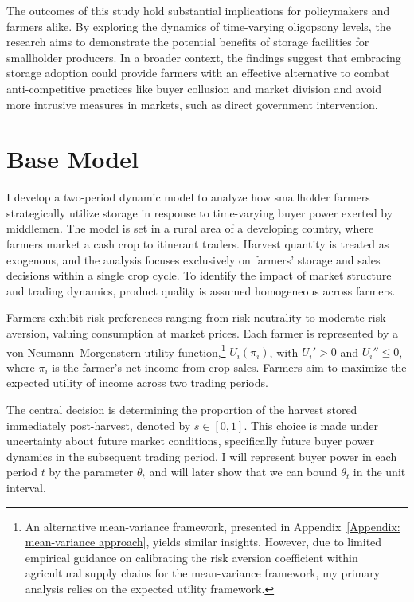 The outcomes of this study hold substantial implications for policymakers and farmers alike. By exploring the dynamics of time-varying oligopsony levels, the research aims to demonstrate the potential benefits of storage facilities for smallholder producers. In a broader context, the findings suggest that embracing storage adoption could provide farmers with an effective alternative to combat anti-competitive practices like buyer collusion and market division and avoid more intrusive measures in markets, such as direct government intervention.





\section{Base Model}
\noindent I develop a two-period dynamic model to analyze how smallholder farmers strategically utilize storage in response to time-varying buyer power exerted by middlemen. The model is set in a rural area of a developing country, where farmers market a cash crop to itinerant traders. Harvest quantity is treated as exogenous, and the analysis focuses exclusively on farmers' storage and sales decisions within a single crop cycle. To identify the impact of market structure and trading dynamics, product quality is assumed homogeneous across farmers.

Farmers exhibit risk preferences ranging from risk neutrality to moderate risk aversion, valuing consumption at market prices. Each farmer is represented by a von Neumann–Morgenstern utility function,\footnote{An alternative mean-variance framework, presented in Appendix~\ref{Appendix: mean-variance approach}, yields similar insights. However, due to limited empirical guidance on calibrating the risk aversion coefficient within agricultural supply chains for the mean-variance framework, my primary analysis relies on the expected utility framework.} $U_i(\pi_i)$, with $U_i' > 0$ and $U_i'' \leq 0$, where $\pi_i$ is the farmer's net income from crop sales. Farmers aim to maximize the expected utility of income across two trading periods.

The central decision is determining the proportion of the harvest stored immediately post-harvest, denoted by $s \in [0,1]$. This choice is made under uncertainty about future market conditions, specifically future buyer power dynamics in the subsequent trading period. I will represent buyer power in each period $t$ by the parameter $\theta_t$ and will later show that we can bound $\theta_t$ in the unit interval.

